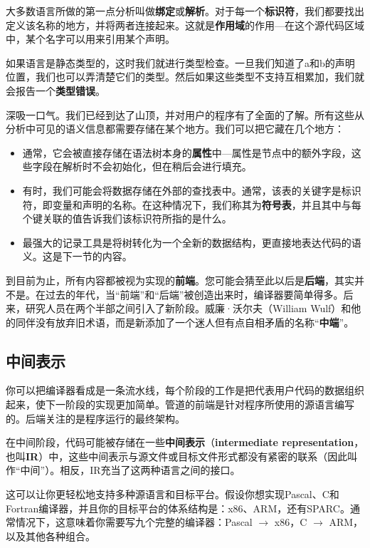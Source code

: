 \documentclass[cn,11pt,chinese]{elegantbook}
\begin{document}
大多数语言所做的第一点分析叫做\textbf{绑定}或\textbf{解析}。对于每一个\textbf{标识符}，我们都要找出定义该名称的地方，并将两者连接起来。这就是\textbf{作用域}的作用—在这个源代码区域中，某个名字可以用来引用某个声明。

如果语言是静态类型的，这时我们就进行类型检查。一旦我们知道了a和b的声明位置，我们也可以弄清楚它们的类型。然后如果这些类型不支持互相累加，我们就会报告一个\textbf{类型错误}。

深吸一口气。我们已经到达了山顶，并对用户的程序有了全面的了解。所有这些从分析中可见的语义信息都需要存储在某个地方。我们可以把它藏在几个地方：

\begin{itemize}
  \item 通常，它会被直接存储在语法树本身的\textbf{属性}中—属性是节点中的额外字段，这些字段在解析时不会初始化，但在稍后会进行填充。
  \item 有时，我们可能会将数据存储在外部的查找表中。通常，该表的关键字是标识符，即变量和声明的名称。在这种情况下，我们称其为\textbf{符号表}，并且其中与每个键关联的值告诉我们该标识符所指的是什么。
  \item 最强大的记录工具是将树转化为一个全新的数据结构，更直接地表达代码的语义。这是下一节的内容。
\end{itemize}

到目前为止，所有内容都被视为实现的\textbf{前端}。您可能会猜至此以后是\textbf{后端}，其实并不是。在过去的年代，当“前端”和“后端”被创造出来时，编译器要简单得多。后来，研究人员在两个半部之间引入了新阶段。威廉·沃尔夫（William Wulf）和他的同伴没有放弃旧术语，而是新添加了一个迷人但有点自相矛盾的名称“\textbf{中端}”。

\subsection{中间表示}

你可以把编译器看成是一条流水线，每个阶段的工作是把代表用户代码的数据组织起来，使下一阶段的实现更加简单。管道的前端是针对程序所使用的源语言编写的。后端关注的是程序运行的最终架构。

在中间阶段，代码可能被存储在一些\textbf{中间表示}（\textbf{intermediate representation}， 也叫\textbf{IR}）中，这些中间表示与源文件或目标文件形式都没有紧密的联系（因此叫作“中间”）。相反，IR充当了这两种语言之间的接口。

这可以让你更轻松地支持多种源语言和目标平台。假设你想实现Pascal、C和Fortran编译器，并且你的目标平台的体系结构是：x86、ARM，还有SPARC。通常情况下，这意味着你需要写九个完整的编译器：Pascal $\rightarrow$ x86，C $\rightarrow$ ARM，以及其他各种组合。
\end{document}
